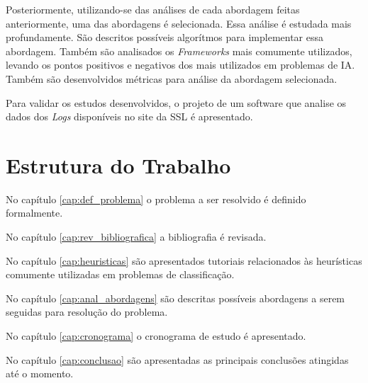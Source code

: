 Posteriormente, utilizando-se das análises de cada abordagem feitas anteriormente,
uma das abordagens é selecionada. Essa análise é estudada mais profundamente.
São descritos possíveis algorítmos para implementar essa abordagem. Também são
analisados os \textit{Frameworks} mais comumente utilizados, levando os pontos
positivos e negativos dos mais utilizados em problemas de IA. Também são
desenvolvidos métricas para análise da abordagem selecionada.

Para validar os estudos desenvolvidos, o projeto de um software
que analise os dados dos \textit{Logs} disponíveis no site da SSL é apresentado.

\section{Estrutura do Trabalho}

No capítulo \ref{cap:def_problema} o problema a ser resolvido é definido formalmente.

No capítulo \ref{cap:rev_bibliografica} a bibliografia é revisada.

No capítulo \ref{cap:heuristicas} são apresentados tutoriais relacionados às 
heurísticas comumente utilizadas em problemas de classificação.

No capítulo \ref{cap:anal_abordagens} são descritas possíveis abordagens a serem
seguidas para resolução do problema.

No capítulo \ref{cap:cronograma} o cronograma de estudo é apresentado.

No capítulo \ref{cap:conclusao} são apresentadas as principais conclusões atingidas
até o momento.
